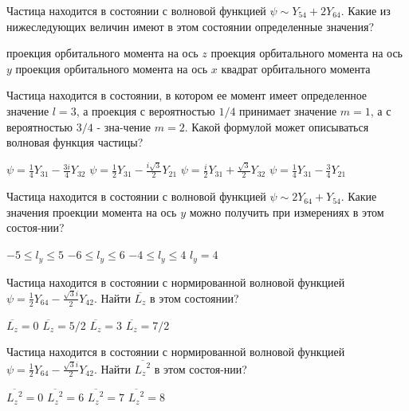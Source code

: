 \documentclass[11pt,a4paper]{exam}
\begin{document}
\begin{questions}
\question Частица находится в состоянии с волновой функцией $\psi  \sim {Y_{54}} + 2{Y_{64}}$. Какие из нижеследующих величин имеют в этом состоянии определенные значения?
\begin{choices}
\choice проекция орбитального момента на ось $z$
\choice проекция орбитального момента на ось $y$
\choice проекция орбитального момента на ось $x$
\choice квадрат орбитального момента 
\end{choices}

\question Частица находится в состоянии, в котором ее момент имеет определенное значение $l = 3$, а проекция с вероятностью $1/4$ принимает значение $m = 1$, а с вероятностью $3/4$ - зна-чение $m = 2$. Какой формулой может описываться волновая функция частицы?
\begin{choices}
\choice $\psi  = \frac{1}{4}{Y_{31}} - \frac{{3i}}{4}{Y_{32}}$         
\choice $\psi  = \frac{1}{2}{Y_{31}} - \frac{{i\sqrt 3 }}{2}{Y_{21}}$
\choice $\psi  = \frac{i}{2}{Y_{31}} + \frac{{\sqrt 3 }}{2}{Y_{32}}$         
\choice $\psi  = \frac{1}{4}{Y_{31}} - \frac{3}{4}{Y_{21}}$
\end{choices}

\question Частица находится в состоянии с волновой функцией $\psi  \sim 2{Y_{64}} + {Y_{54}}$. Какие значения проекции момента на ось $y$ можно получить при измерениях в этом состоя-нии?
\begin{choices}
\choice $ - 5 \le {l_y} \le 5$     
\choice $ - 6 \le {l_y} \le 6$     
\choice $ - 4 \le {l_y} \le 4$     
\choice ${l_y} = 4$
\end{choices}

\question Частица находится в состоянии с нормированной волновой функцией $\psi  = \frac{1}{2}{Y_{64}} - \frac{{\sqrt 3 i}}{2}{Y_{42}}$. Найти $\overline {{L_z}} $ в этом состоянии?
\begin{choices}
\choice $\overline {{L_z}}  = 0$      
\choice $\overline {{L_z}}  = 5/2$    
\choice $\overline {{L_z}}  = 3$      
\choice $\overline {{L_z}}  = 7/2$
\end{choices}

\question Частица находится в состоянии с нормированной волновой функцией $\psi  = \frac{1}{2}{Y_{64}} - \frac{{\sqrt 3 i}}{2}{Y_{42}}$. Найти $\overline {{L_z}^2} $ в этом состоя-нии?
\begin{choices}
\choice $\overline {{L_z}^2}  = 0$    
\choice $\overline {{L_z}^2}  = 6$    
\choice $\overline {{L_z}^2}  = 7$    
\choice $\overline {{L_z}^2}  = 8$
\end{choices}


\end{questions}
\end{document}
